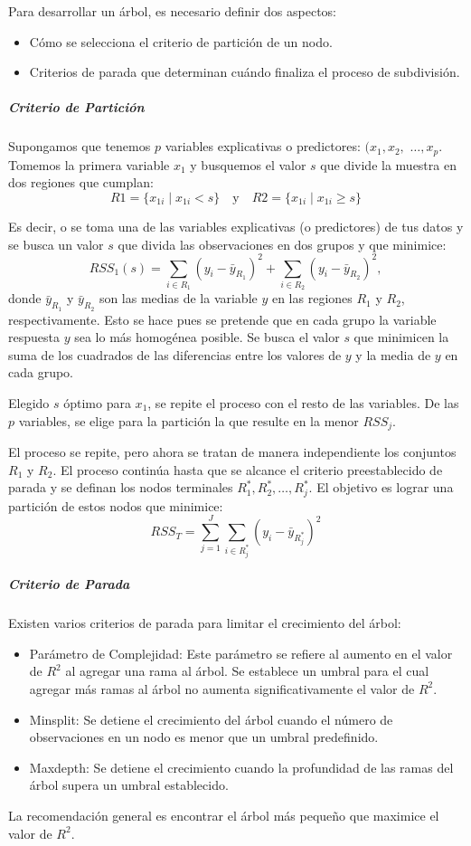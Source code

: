 Para desarrollar un árbol, es necesario definir dos aspectos:
\begin{itemize}
	\item Cómo se selecciona el criterio de partición de un nodo.
	\item Criterios de parada que determinan cuándo finaliza el proceso de subdivisión.
\end{itemize}


\subparagraph{Criterio de Partición}
Supongamos que tenemos \(p\) variables explicativas o predictores: $(x_1, x_2,$ $\ldots, x_p$. Tomemos la primera variable \(x_1\) y busquemos el valor \(s\) que divide la muestra en dos regiones que cumplan:
\[
R1 = \{x_{1i} \mid x_{1i} < s\} \quad \text{y} \quad R2 = \{x_{1i} \mid x_{1i} \geq s\}
\]

Es decir, o se toma una de las variables explicativas (o predictores) de tus datos y se busca un valor $s$ que divida las observaciones en dos grupos y que minimice:
\[
RSS_1(s) = \sum_{i \in R_1} (y_i - \bar{y}_{R_1})^2 + \sum_{i \in R_2} (y_i - \bar{y}_{R_2})^2,
\]
donde \(\bar{y}_{R_1}\) y \(\bar{y}_{R_2}\) son las medias de la variable \(y\) en las regiones \(R_1\) y \(R_2\), respectivamente. Esto se hace pues se pretende que en cada grupo la variable respuesta \(y\) sea lo más homogénea posible. Se busca el valor $s$ que minimicen la suma de los cuadrados de las diferencias entre los valores de $y$ y la media de $y$ en cada grupo.

Elegido \(s\) óptimo para \(x_1\), se repite el proceso con el resto de las variables. De las \(p\) variables, se elige para la partición la que resulte en la menor \(RSS_j\).

El proceso se repite, pero ahora se tratan de manera independiente los conjuntos \(R_1\) y \(R_2\). El proceso continúa hasta que se alcance el criterio preestablecido de parada y se definan los nodos terminales \(R_1^*, R_2^*, \ldots, R_j^*\). El objetivo es lograr una partición de estos nodos que minimice:
\[
RSS_T = \sum_{j=1}^{J} \sum_{i \in R_j^*} (y_i - \bar{y}_{R_j^*})^2
\]

\subparagraph{Criterio de Parada}
Existen varios criterios de parada para limitar el crecimiento del árbol:
\begin{itemize}
	\item Parámetro de Complejidad: Este parámetro se refiere al aumento en el valor de \(R^2\) al agregar una rama al árbol. Se establece un umbral para el cual agregar más ramas al árbol no aumenta significativamente el valor de \(R^2\).
	\item Minsplit: Se detiene el crecimiento del árbol cuando el número de observaciones en un nodo es menor que un umbral predefinido.
	\item Maxdepth: Se detiene el crecimiento cuando la profundidad de las ramas del árbol supera un umbral establecido.
\end{itemize}
La recomendación general es encontrar el árbol más pequeño que maximice el valor de \(R^2\).

